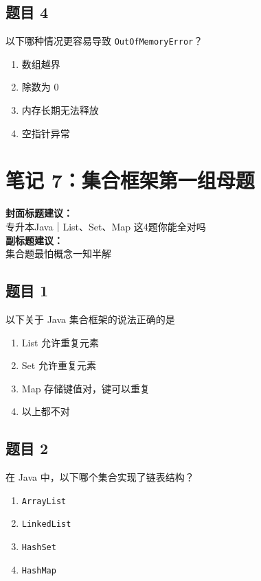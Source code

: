 \documentclass[12pt,a4paper]{ctexart}
\begin{document}
\subsection*{题目 4}
以下哪种情况更容易导致 \texttt{OutOfMemoryError}？
\begin{enumerate}[label=\Alph*.]
    \item 数组越界
    \item 除数为 0
    \item 内存长期无法释放
    \item 空指针异常
\end{enumerate}

\newpage

\section{笔记 7：集合框架第一组母题}
\begin{coverbox}
\textbf{封面标题建议：}\\
专升本Java｜List、Set、Map 这4题你能全对吗\\
\textbf{副标题建议：}\\
集合题最怕概念一知半解
\end{coverbox}

\subsection*{题目 1}
以下关于 Java 集合框架的说法正确的是
\begin{enumerate}[label=\Alph*.]
    \item List 允许重复元素
    \item Set 允许重复元素
    \item Map 存储键值对，键可以重复
    \item 以上都不对
\end{enumerate}

\subsection*{题目 2}
在 Java 中，以下哪个集合实现了链表结构？
\begin{enumerate}[label=\Alph*.]
    \item \texttt{ArrayList}
    \item \texttt{LinkedList}
    \item \texttt{HashSet}
    \item \texttt{HashMap}
\end{enumerate}
\end{document}
